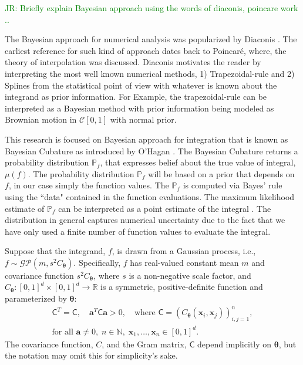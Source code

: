 \documentclass{iitthesis}          %
\newcommand{\bm}[1]{\boldsymbol{#1}}
\newcommand{\vtheta}{{\bm{\theta}}}
\newcommand{\va}{\bm{a}}
\newcommand{\vx}{\bm{x}}
\newcommand{\mC}{\mathsf{C}}
\newcommand{\JRNote}[1]{{\textcolor{green}{JR: #1}}}
\begin{document}
\label{sec:BC} 
\JRNote{Briefly explain Bayesian approach using the words of diaconis, poincare work ..}


The Bayesian approach for numerical analysis was popularized by Diaconis \cite{Dia88a}. The earliest reference for such kind of approach dates back to Poincar\'e, where, the theory of interpolation was discussed.
Diaconis motivates the reader by interpreting the most well known numerical methods, 1) Trapezoidal-rule and 2) Splines from the statistical point of view with whatever is known about the integrand as prior information. 
For Example, the trapezoidal-rule can be interpreted as a Bayesian method with prior information being modeled as Brownian motion in $\mathcal{C}[0,1]$ with normal prior.

This research is focused on Bayesian approach for integration that is known as Bayesian Cubature as introduced by O'Hagan \cite{OHagen1991}. 
The Bayesian Cubature returns a probability distribution $\mathbb{P}_f$, that expresses belief about the true value of integral, $\mu(f)$.
The probability distribution $\mathbb{P}_f$ will be based on a prior that depends on $f$, in our case simply the function values. 
The $\mathbb{P}_f$ is computed via Bayes' rule using  the ``data" contained in the function evaluations. 
The maximum likelihood estimate of $\mathbb{P}_f$ can be interpreted as a point estimate of the integral \cite{BriEtal18a}. The distribution in general captures numerical uncertainty due to the fact that we have only used a finite number of function values to evaluate the integral.

\label{sec:BayesPostErr}

Suppose that the integrand, $f$, is drawn from a Gaussian process, i.e., $f \sim \mathcal{GP}(m,s^2 C_\vtheta)$.  Specifically, $f$ has real-valued constant mean $m$ and covariance function $s^2C_\vtheta$, where $s$ is a non-negative scale factor, and $C_\vtheta: [0,1]^d \times [0,1]^d \to \mathbb{R} $ is a symmetric, positive-definite function and parameterized by $\vtheta$:
\begin{multline} \label{FJH:eq:CondPosDef}
\mC^T = \mC,  \quad \va^T \mC \va > 0, \quad \text{where }  \mC = \left(  C_\vtheta(\vx_i,\vx_j)  \right)_{i,j=1}^n,\\
 \text{for all } \va \ne 0, \;
 n\in \mathbb{N}, \; \vx_1, \ldots, \vx_n \in [0,1]^d.
\end{multline}
The covariance function, $C$, and the Gram matrix, $\mC$ depend implicitly on $\vtheta$, but the notation may omit this for simplicity's sake.
\end{document}
